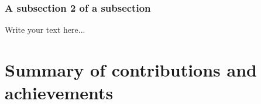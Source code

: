 \subsubsection{A subsection 2 of a subsection}
\label{sec:intro_some_subsub2}
Write your text here...

\section{Summary of contributions and achievements} %
\label{sec:intro_sum_results} %





